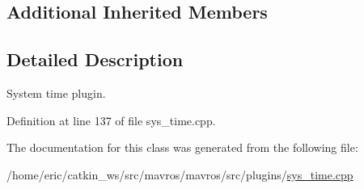 \subsection*{Additional Inherited Members}


\subsection{Detailed Description}
System time plugin. 

Definition at line 137 of file sys\+\_\+time.\+cpp.



The documentation for this class was generated from the following file\+:\begin{DoxyCompactItemize}
\item 
/home/eric/catkin\+\_\+ws/src/mavros/mavros/src/plugins/\mbox{\hyperlink{sys__time_8cpp}{sys\+\_\+time.\+cpp}}\end{DoxyCompactItemize}
